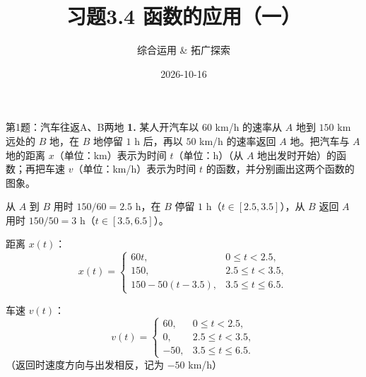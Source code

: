 \documentclass[10pt,aspectratio=169,serif,fleqn]{beamer}
\title[习题3.4]{习题3.4 \quad 函数的应用（一）}
\subtitle{综合运用 \& 拓广探索}
\author{}
\institute{}
\date{2026-10-16}
\begin{document}
\begin{frame}
  \titlepage
\end{frame}

\begin{frame}[t]{第1题：汽车往返A、B两地}
\textbf{1.} 某人开汽车以 $60$ km/h 的速率从 $A$ 地到 $150$ km 远处的 $B$ 地，在 $B$ 地停留 $1$ h 后，再以 $50$ km/h 的速率返回 $A$ 地。把汽车与 $A$ 地的距离 $x$（单位：km）表示为时间 $t$（单位：h）（从 $A$ 地出发时开始）的函数；再把车速 $v$（单位：km/h）表示为时间 $t$ 的函数，并分别画出这两个函数的图象。
\end{frame}

\begin{frame}[t]{}
	\vspace{-2em}
\begin{tcolorbox}[colback=orange!10,colframe=orange,title=\textbf{解}]
从 $A$ 到 $B$ 用时 $150/60=2.5$ h，在 $B$ 停留 $1$ h（$t\in[2.5,3.5]$），从 $B$ 返回 $A$ 用时 $150/50=3$ h（$t\in[3.5,6.5]$）。

\vspace{0.3em}
距离 $x(t)$：
\[
x(t)=\begin{cases}
60t, & 0\le t<2.5,\\
150, & 2.5\le t<3.5,\\
150-50(t-3.5), & 3.5\le t\le 6.5.
\end{cases}
\]

\vspace{0.3em}
车速 $v(t)$：
\[
v(t)=\begin{cases}
60, & 0\le t<2.5,\\
0, & 2.5\le t<3.5,\\
-50, & 3.5\le t\le 6.5.
\end{cases}
\]
（返回时速度方向与出发相反，记为 $-50$ km/h）
\end{tcolorbox}
\end{frame}
\end{document}
